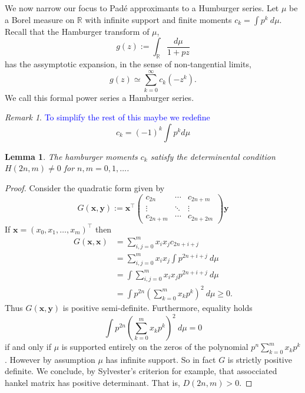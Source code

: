 \documentclass{amsart}
\newtheorem{lemma}[theorem]{Lemma}
\theoremstyle{remark}
\newtheorem{remark}[theorem]{Remark}
\numberwithin{equation}{section}
\newcommand{\tc}{\textcolor{blue}}
\newcommand{\RR}{\mathbb{R}}
\begin{document}
We now narrow our focus to Pad\'e approximants to a Humburger series. Let $\mu$ be a Borel measure on $\RR$ with infinite support and finite moments $c_k = \int p^k ~d\mu$. Recall that the Hamburger transform of $\mu$,
\[
    g(z) := \int_\RR \frac{d\mu}{1+pz}
\]
has the assymptotic expansion, in the sense of non-tangential limits,
\[
    g(z) \simeq \sum_{k=0}^\infty c_k (-z^k).
\]
We call this formal power series a Hamburger series. 

\begin{remark}
    \tc{To simplify the rest of this maybe we redefine}
    \[
        c_k = (-1)^k\int p^k d\mu
    \]
\end{remark}

\begin{lemma}
    The hamburger moments $c_k$ satisfy the determinental condition $H(2n, m) \neq 0$ for $n,m = 0, 1, \ldots$. 
\end{lemma}
\begin{proof}
    Consider the quadratic form given by
    \[
        G(\mathbf{x}, \mathbf{y}) := 
        \mathbf{x}^\top
        \begin{pmatrix}
            c_{2n} & \cdots & c_{2n+m} \\
            \vdots & \ddots & \vdots  \\
            c_{2n+m} & \cdots & c_{2n+2m}
        \end{pmatrix}
        \mathbf{y}
    \]
    If $\mathbf{x} = (x_0, x_1, \ldots, x_m)^\top$ then
    \begin{align*}
        G(\mathbf{x}, \mathbf{x})
        &= \sum_{i,j=0}^m x_ix_jc_{2n+i+j} \\
        &= \sum_{i,j=0}^m x_ix_j \int p^{2n+i+j} ~d\mu \\
        &= \int \sum_{i,j=0}^m x_ix_jp^{2n+i+j} ~d\mu \\
        &= \int p^{2n}\left(\sum_{k=0}^m x_kp^{k}\right)^2 ~d\mu \geq 0.
    \end{align*}
    Thus $G(\mathbf{x}, \mathbf{y})$ is positive semi-definite. Furthermore, equality holds
    \[
        \int p^{2n}\left(\sum_{k=0}^m x_kp^{k}\right)^2 ~d\mu = 0
    \]
    if and only if $\mu$ is supported entirely on the zeros of the polynomial $p^n\sum_{k=0}^m x_kp^{k}$. However by assumption $\mu$ has infinite support. So in fact $G$ is strictly positive definite. We conclude, by Sylvester's criterion for example, that assocciated hankel matrix has positive determinant. That is, $D(2n, m) > 0$.
\end{proof}
\end{document}
